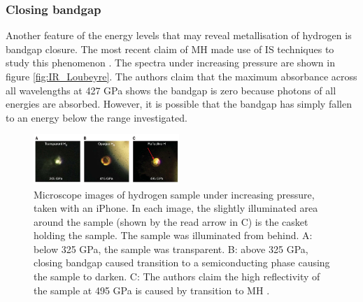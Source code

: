 \documentclass[esp]{FCEFyN-class}
\begin{document}







\subsubsection{Closing bandgap}

Another feature of the energy levels that may reveal metallisation of hydrogen is bandgap closure. The most recent claim of MH made use of IS techniques to study this phenomenon \cite{loubeyre2020}. The spectra under increasing pressure are shown in figure \ref{fig:IR_Loubeyre}. The authors claim that the maximum absorbance across all wavelengths at 427 GPa shows the bandgap is zero because photons of all energies are absorbed. However, it is possible that the bandgap has simply fallen to an energy below the range investigated.

\begin{figure}[H]
    \centering
    \includegraphics[width=0.49\textwidth]{DiasSilvera2017img.pdf}
    \caption{Microscope images of hydrogen sample under increasing pressure, taken with an iPhone. In each image, the slightly illuminated area around the sample (shown by the read arrow in C) is the casket holding the sample. The sample was illuminated from behind. A: below 325 GPa, the sample was transparent. B: above 325 GPa, closing bandgap caused transition to a semiconducting phase causing the sample to darken. C: The authors claim the high reflectivity of the sample at 495 GPa is caused by transition to MH \cite{dias_silvera_2017}.}
    \label{fig:DiasSilvera2017img}
\end{figure}
\vspace{3mm} %
\end{document}
